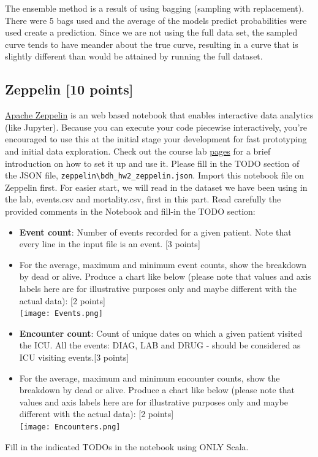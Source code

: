 \documentclass[12pt]{article}
\begin{document}
The ensemble method is a result of using bagging (sampling with replacement). There were 5 bags used and the average of the models predict probabilities were used create a prediction.  Since we are not using the full data set, the sampled curve tends to have meander about the true curve, resulting in a curve that is slightly different than would be attained by running the full dataset.

\iffalse
\subsection{Zeppelin [10 points]}
\href{http://zeppelin.apache.org/}{Apache Zeppelin} is an web based notebook that enables interactive data analytics (like Jupyter).
Because you can execute your code piecewise interactively, you're encouraged to use this at the initial stage your development for fast prototyping and initial data exploration. Check out the course lab \href{http://www.sunlab.org/teaching/cse6250/spring2018/lab/zeppelin-intro/}{pages} for a brief introduction on how to set it up and use it. Please fill in the TODO section of the JSON file, \texttt{zeppelin\textbackslash bdh\_hw2\_zeppelin.json}. Import this notebook file on Zeppelin first.
For easier start, we will read in the dataset we have been using in the lab, events.csv and mortality.csv, first in this part. Read carefully the provided comments in the Notebook and fill-in the TODO section:

\begin{itemize}
\item \textbf{Event count}: Number of events recorded for a given patient. Note that every line in the input file is an event. [3 points]
\item For the average, maximum and minimum event counts, show the breakdown by dead or alive. Produce a chart like below (please note that values and axis labels here are for illustrative purposes only and maybe different with the actual data): [2 points]\\
\texttt{[image: Events.png]}
\item \textbf{Encounter count}: Count of unique dates on which a given patient visited the ICU. All the events: DIAG, LAB and DRUG - should be considered as ICU visiting events.[3 points]
\item For the average, maximum and minimum encounter counts, show the breakdown by dead or alive. Produce a chart like below (please note that values and axis labels here are for illustrative purposes only and maybe different with the actual data): [2 points]\\
\texttt{[image: Encounters.png]}
\end{itemize}
Fill in the indicated TODOs in the notebook using ONLY Scala.\\
\end{document}
